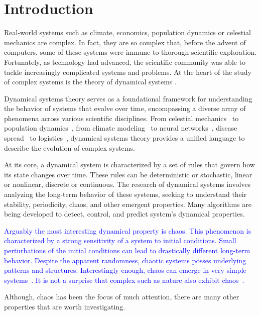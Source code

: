 \chapter{Introduction}
\label{sec:Introduction}

Real-world systems such as climate, economics, population dynamics or celestial mechanics are complex.
In fact, they are so complex that, before the advent of computers, some of these systems were immune to thorough scientific exploration.
Fortunately, as technology had advanced, the scientific community was able to tackle increasingly complicated systems and problems.
At the heart of the study of complex systems is the theory of dynamical systems \cite{Devaney20211026, Hirsch2013, Strogatz201854}.
\par
Dynamical systems theory serves as a foundational framework for understanding the behavior of systems that evolve over time, encompassing a diverse array of phenomena across various scientific disciplines.
From celestial mechanics~\cite{Holmes1990} to population dynamics~\cite{Hastings1993,Hadeler2001}, from climate modeling~\cite{Ghil2023} to neural networks~\cite{Cessac2009, Vogt2020, Li2019}, disease spread~\cite{Ritelli20210930} to logistics~\cite{Kumara2003}, dynamical systems theory provides a unified language to describe the evolution of complex systems.
\par
At its core, a dynamical system is characterized by a set of rules that govern how its state changes over time.
These rules can be deterministic or stochastic, linear or nonlinear, discrete or continuous.
The research of dynamical systems involves analyzing the long-term behavior of these systems, seeking to understand their stability, periodicity, chaos, and other emergent properties.
Many algorithms are being developed to detect, control, and predict system's dynamical properties.
\par
\textcolor{blue}{
Arguably the most interesting dynamical property is chaos.
This phenomenon is characterized by a strong sensitivity of a system to initial conditions.
Small perturbations of the initial conditions can lead to drastically different long-term behavior.
Despite the apparent randomness, chaotic systems posses underlying patterns and structures.
Interestingly enough, chaos can emerge in very simple systems~\cite{Lorenz2004,May19760610}.
It is not a surprise that complex such as nature also exhibit chaos~\cite{Toker2020}.
}
\par
Although, chaos has been the focus of much attention, there are many other properties that are worth investigating.
